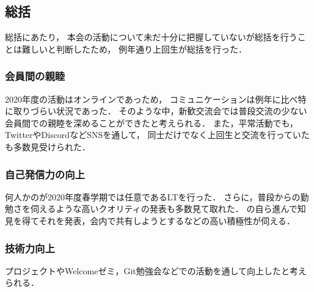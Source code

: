 \subsection*{\firstGrade{}総括}



\firstGrade{}総括にあたり，
本会の活動について未だ十分に把握していない\firstGrade{}が総括を行うことは難しいと判断したため，
例年通り上回生が総括を行った．


\subsubsection*{会員間の親睦}
2020年度の活動はオンラインであっため，
コミュニケーションは例年に比べ特に取りづらい状況であった．
そのような中，新歓交流会では普段交流の少ない会員間での親睦を深めることができたと考えられる．
また，平常活動でも，TwitterやDiscordなどSNSを通して，
\firstGrade{}同士だけでなく上回生と交流を行っていた\firstGrade{}も多数見受けられた．


\subsubsection*{自己発信力の向上}
何人かの\firstGrade{}が2020年度春学期では任意であるLTを行った．
さらに，普段からの勤勉さを伺えるような高いクオリティの発表も多数見て取れた．
\firstGrade{}の自ら進んで知見を得てそれを発表，会内で共有しようとするなどの高い積極性が伺える．


\subsubsection*{技術力向上}
プロジェクトやWelcomeゼミ，Git勉強会などでの活動を通して向上したと考えられる．
